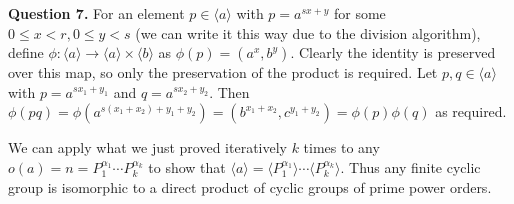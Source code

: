 \documentclass[letterpaper, reqno,11pt]{article}
\begin{document}
{\medskip\noindent\bf Question 7.} For an element $p\in\langle a\rangle$ with $p=a^{sx+y}$ for some $0\leq x<r,0\leq y<s$ (we can write it this way due to the division algorithm), define $\phi:\langle a\rangle\to\langle a\rangle\times\langle b\rangle$ as $\phi(p)=(a^{x},b^{y})$. Clearly the identity is preserved over this map, so only the preservation of the product is required. Let $p,q\in\langle a\rangle$ with $p=a^{sx_1+y_1}$ and $q=a^{sx_2+y_2}$. Then $\phi(pq)=\phi\left(a^{s(x_1+x_2)+y_1+y_2}\right)=\left( b^{x_1+x_2},c^{y_1+y_2} \right) =\phi(p)\phi(q)$ as required.

We can apply what we just proved iteratively $k$ times to any $o(a)=n=P_1^{\alpha_1}\cdots P_k^{\alpha_k}$ to show that $\langle a\rangle=\langle P_1^{\alpha_1}\rangle\cdots\langle P_k^{\alpha_k}\rangle$. Thus any finite cyclic group is isomorphic to a direct product of cyclic groups of prime power orders.
\end{document}
